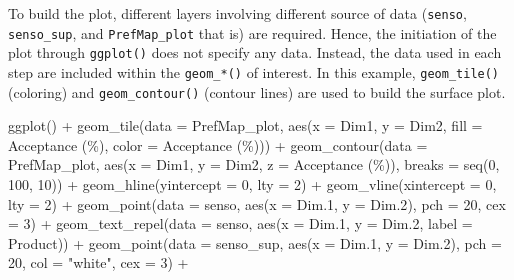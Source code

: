\documentclass[
]{krantz}
\makeatletter
\newenvironment{Shaded}{\begin{snugshade}}{\end{snugshade}}
\newcommand{\AttributeTok}[1]{\textcolor[rgb]{0.61,0.61,0.61}{#1}}
\newcommand{\DecValTok}[1]{\textcolor[rgb]{0.06,0.06,0.06}{#1}}
\newcommand{\FloatTok}[1]{\textcolor[rgb]{0.06,0.06,0.06}{#1}}
\newcommand{\FunctionTok}[1]{\textcolor[rgb]{0,0,0}{#1}}
\newcommand{\NormalTok}[1]{#1}
\newcommand{\SpecialCharTok}[1]{\textcolor[rgb]{0,0,0}{#1}}
\newcommand{\StringTok}[1]{\textcolor[rgb]{0.5,0.5,0.5}{#1}}
\newenvironment{kframe}{%
\medskip{}
\setlength{\fboxsep}{.8em}
 \def\at@end@of@kframe{}%
 \ifinner\ifhmode%
  \def\at@end@of@kframe{\end{minipage}}%
  \begin{minipage}{\columnwidth}%
 \fi\fi%
 \def\FrameCommand##1{\hskip\@totalleftmargin \hskip-\fboxsep
 \colorbox{shadecolor}{##1}\hskip-\fboxsep
     \hskip-\linewidth \hskip-\@totalleftmargin \hskip\columnwidth}%
 \MakeFramed {\advance\hsize-\width
   \@totalleftmargin\z@ \linewidth\hsize
   \@setminipage}}%
 {\par\unskip\endMakeFramed%
 \at@end@of@kframe}
\renewenvironment{Shaded}{\begin{kframe}}{\end{kframe}}
\makeatother
\begin{document}
To build the plot, different layers involving different source of data (\texttt{senso}, \texttt{senso\_sup}, and \texttt{PrefMap\_plot} that is) are required. Hence, the initiation of the plot through \texttt{ggplot()} does not specify any data. Instead, the data used in each step are included within the \texttt{geom\_*()} of interest. In this example, \texttt{geom\_tile()} (coloring) and \texttt{geom\_contour()} (contour lines) are used to build the surface plot.

\begin{Shaded}
\begin{Highlighting}[]
\FunctionTok{ggplot}\NormalTok{() }\SpecialCharTok{+}
  \FunctionTok{geom\_tile}\NormalTok{(}\AttributeTok{data =}\NormalTok{ PrefMap\_plot, }\FunctionTok{aes}\NormalTok{(}\AttributeTok{x =}\NormalTok{ Dim1, }\AttributeTok{y =}\NormalTok{ Dim2, }\AttributeTok{fill =} \StringTok{\textasciigrave{}}\AttributeTok{Acceptance (\%)}\StringTok{\textasciigrave{}}\NormalTok{, }\AttributeTok{color =} \StringTok{\textasciigrave{}}\AttributeTok{Acceptance (\%)}\StringTok{\textasciigrave{}}\NormalTok{)) }\SpecialCharTok{+}
  \FunctionTok{geom\_contour}\NormalTok{(}\AttributeTok{data =}\NormalTok{ PrefMap\_plot, }\FunctionTok{aes}\NormalTok{(}\AttributeTok{x =}\NormalTok{ Dim1, }\AttributeTok{y =}\NormalTok{ Dim2, }\AttributeTok{z =} \StringTok{\textasciigrave{}}\AttributeTok{Acceptance (\%)}\StringTok{\textasciigrave{}}\NormalTok{), }\AttributeTok{breaks =} \FunctionTok{seq}\NormalTok{(}\DecValTok{0}\NormalTok{, }\DecValTok{100}\NormalTok{, }\DecValTok{10}\NormalTok{)) }\SpecialCharTok{+}
  \FunctionTok{geom\_hline}\NormalTok{(}\AttributeTok{yintercept =} \DecValTok{0}\NormalTok{, }\AttributeTok{lty =} \DecValTok{2}\NormalTok{) }\SpecialCharTok{+}
  \FunctionTok{geom\_vline}\NormalTok{(}\AttributeTok{xintercept =} \DecValTok{0}\NormalTok{, }\AttributeTok{lty =} \DecValTok{2}\NormalTok{) }\SpecialCharTok{+}
  \FunctionTok{geom\_point}\NormalTok{(}\AttributeTok{data =}\NormalTok{ senso, }\FunctionTok{aes}\NormalTok{(}\AttributeTok{x =}\NormalTok{ Dim}\FloatTok{.1}\NormalTok{, }\AttributeTok{y =}\NormalTok{ Dim}\FloatTok{.2}\NormalTok{), }\AttributeTok{pch =} \DecValTok{20}\NormalTok{, }\AttributeTok{cex =} \DecValTok{3}\NormalTok{) }\SpecialCharTok{+}
  \FunctionTok{geom\_text\_repel}\NormalTok{(}\AttributeTok{data =}\NormalTok{ senso, }\FunctionTok{aes}\NormalTok{(}\AttributeTok{x =}\NormalTok{ Dim}\FloatTok{.1}\NormalTok{, }\AttributeTok{y =}\NormalTok{ Dim}\FloatTok{.2}\NormalTok{, }\AttributeTok{label =}\NormalTok{ Product)) }\SpecialCharTok{+}
  \FunctionTok{geom\_point}\NormalTok{(}\AttributeTok{data =}\NormalTok{ senso\_sup, }\FunctionTok{aes}\NormalTok{(}\AttributeTok{x =}\NormalTok{ Dim}\FloatTok{.1}\NormalTok{, }\AttributeTok{y =}\NormalTok{ Dim}\FloatTok{.2}\NormalTok{), }\AttributeTok{pch =} \DecValTok{20}\NormalTok{, }\AttributeTok{col =} \StringTok{"white"}\NormalTok{, }\AttributeTok{cex =} \DecValTok{3}\NormalTok{) }\SpecialCharTok{+}

\end{Highlighting}
\end{Shaded}
\end{document}
